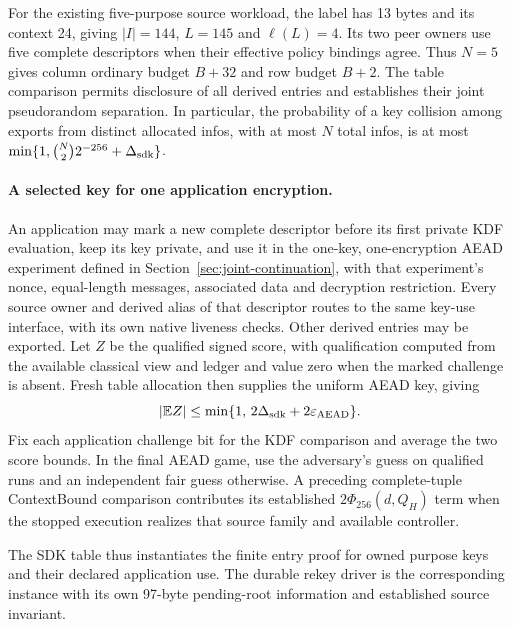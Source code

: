 For the existing five-purpose source workload, the label has 13 bytes and
its context 24, giving $|I|=144$, $L=145$ and $\ell(L)=4$. Its two peer
owners use five complete descriptors when their effective policy bindings
agree. Thus $N=5$ gives column ordinary budget $B+32$ and row budget $B+2$.
The table comparison permits disclosure of all derived entries and
establishes their joint pseudorandom separation. In particular, the
probability of a key collision among exports from distinct allocated infos,
with at most $N$ total infos, is at most $\min\{1,\binom N2 2^{-256}+\Delta_{\rm sdk}\}$.

\paragraph{A selected key for one application encryption.}
An application may mark a new complete descriptor before its first private
KDF evaluation, keep its key private, and use it in the one-key,
one-encryption AEAD experiment defined in
Section~\ref{sec:joint-continuation}, with that experiment's nonce,
equal-length messages, associated data and decryption restriction. Every source owner and derived alias of that descriptor routes
to the same key-use interface, with its own native liveness checks. Other
derived entries may be exported. Let $Z$ be the qualified signed score,
with qualification computed from the available classical view and ledger
and value zero when the marked challenge is absent. Fresh table allocation
then supplies the uniform AEAD key, giving
\[
 |\mathbb E Z|\le\min\{1,\,2\Delta_{\rm sdk}
                                  +2\varepsilon_{\rm AEAD}\}.
\]
Fix each application challenge bit for the KDF comparison and average the
two score bounds. In the final AEAD game, use the adversary's guess on
qualified runs and an independent fair guess otherwise. A preceding
complete-tuple ContextBound comparison contributes its established
$2\Phi_{256}(d,Q_H)$ term when the stopped execution realizes that source
family and available controller.

The SDK table thus instantiates the finite entry proof for owned purpose
keys and their declared application use. The durable rekey driver is the
corresponding instance with its own 97-byte pending-root information and
established source invariant.
